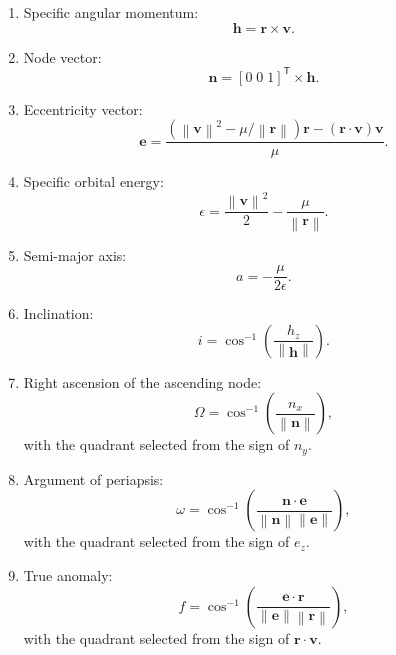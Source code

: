 \documentclass[11pt]{article}
\newcommand{\vect}[1]{\boldsymbol{#1}}
\newcommand{\transpose}{\mathsf{T}}
\newcommand{\norm}[1]{\left\lVert #1 \right\rVert}
\begin{document}
\begin{enumerate}[label=\arabic*.]
\item Specific angular momentum:
\begin{equation}
\vect{h} = \vect{r} \times \vect{v}.
\end{equation}

\item Node vector:
\begin{equation}
\vect{n} = [0\; 0\; 1]^\transpose \times \vect{h}.
\end{equation}

\item Eccentricity vector:
\begin{equation}
\vect{e} = \frac{\left(\norm{\vect{v}}^2 - \mu / \norm{\vect{r}}\right)\vect{r} - (\vect{r} \cdot \vect{v})\vect{v}}{\mu}.
\end{equation}

\item Specific orbital energy:
\begin{equation}
\epsilon = \frac{\norm{\vect{v}}^2}{2} - \frac{\mu}{\norm{\vect{r}}}.
\end{equation}

\item Semi-major axis:
\begin{equation}
a = -\frac{\mu}{2\epsilon}.
\end{equation}

\item Inclination:
\begin{equation}
i = \cos^{-1}\left(\frac{h_z}{\norm{\vect{h}}}\right).
\end{equation}

\item Right ascension of the ascending node:
\begin{equation}
\Omega = \cos^{-1}\left(\frac{n_x}{\norm{\vect{n}}}\right),
\end{equation}
with the quadrant selected from the sign of $n_y$.

\item Argument of periapsis:
\begin{equation}
\omega = \cos^{-1}\left(\frac{\vect{n} \cdot \vect{e}}{\norm{\vect{n}}\norm{\vect{e}}}\right),
\end{equation}
with the quadrant selected from the sign of $e_z$.

\item True anomaly:
\begin{equation}
f = \cos^{-1}\left(\frac{\vect{e} \cdot \vect{r}}{\norm{\vect{e}}\norm{\vect{r}}}\right),
\end{equation}
with the quadrant selected from the sign of $\vect{r} \cdot \vect{v}$.
\end{enumerate}
\end{document}
